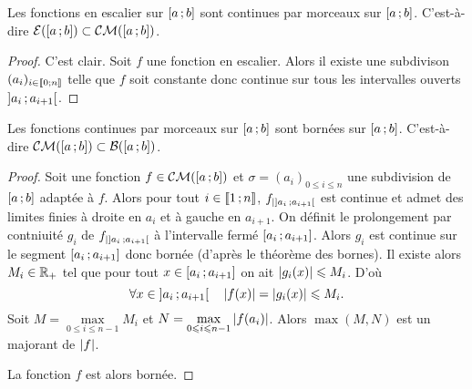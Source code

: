 \begin{prop}
  Les fonctions en escalier sur $\left[ a \, ;  b \right]$ sont continues par morceaux sur $\left[ a \, ;  b \right]$. C'est-à-dire $\mathcal{E}(\left[ a \, ;  b \right]) \subset \mathcal{CM}(\left[ a \, ;  b \right])$.
\end{prop}
\begin{proof}
  C'est clair. Soit $f$ une fonction en escalier. Alors il existe une subdivison $(a_i)_{i \in \mathopen{\llbracket}0\mathclose{}\mathpunct{};n\mathclose{\rrbracket}}$ telle que $f$ soit constante donc continue sur tous les intervalles ouverts $\left] a_i \, ;  a_{i+1} \right[$.
\end{proof}

\begin{prop}
  Les fonctions continues par morceaux sur $\left[ a \, ;  b \right]$ sont bornées sur $\left[ a \, ;  b \right]$. C'est-à-dire $\mathcal{CM}(\left[ a \, ;  b \right]) \subset \mathcal{B}(\left[ a \, ;  b \right])$.
\end{prop}
\begin{proof}
  Soit une fonction $f \in \mathcal{CM}(\left[ a \, ;  b \right])$ et $\sigma=(a_i)_{0 \leqslant i \leqslant n}$ une subdivision de $\left[ a \, ;  b \right]$ adaptée à $f$. Alors pour tout $i \in \mathopen{\llbracket}1\mathclose{}\mathpunct{};n\mathclose{\rrbracket}$, $f_{|\left] a_i \, ;  a_{i+1} \right[}$ est continue et admet des limites finies à droite en $a_{i}$ et à gauche en $a_{i+1}$. On définit le prolongement par contniuité $g_i$ de $f_{|\left] a_i \, ;  a_{i+1} \right[}$ à l'intervalle fermé $\left[ a_i \, ;  a_{i+1} \right]$. Alors $g_i$ est continue sur le segment $\left[ a_i \, ;  a_{i+1} \right]$ donc bornée (d'après le théorème des bornes). Il existe alors $M_i \in \mathbb{R}_+$ tel que pour tout $x \in \left[ a_i \, ;  a_{i+1} \right] $ on ait $\left\lvert g_i(x)\right\rvert \leqslant M_i$. D'où
  \begin{equation}
    \forall x \in \left] a_i \, ;  a_{i+1} \right[ \quad \left\lvert f(x)\right\rvert=\left\lvert g_i(x)\right\rvert \leqslant M_i.
  \end{equation}
  Soit $M=\max\limits_{0 \leqslant i \leqslant n-1} M_i$ et $N=\max\limits_{0 \leqslant i \leqslant n-1} \left\lvert f(a_i)\right\rvert$. Alors $\max(M,N)$ est un majorant de $\left\lvert f\right\rvert$.

  La fonction $f$ est alors bornée.
\end{proof}

